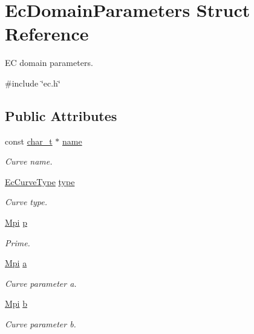 \hypertarget{structEcDomainParameters}{}\section{Ec\+Domain\+Parameters Struct Reference}
\label{structEcDomainParameters}


EC domain parameters.  




{\ttfamily \#include \char`\"{}ec.\+h\char`\"{}}

\subsection*{Public Attributes}
\begin{DoxyCompactItemize}
\item 
const \hyperlink{compiler__port_8h_a40bb5262bf908c328fbcfbe5d29d0201}{char\+\_\+t} $\ast$ \hyperlink{structEcDomainParameters_ae21c1086132f9773bf0be4d23592a297}{name}
\begin{DoxyCompactList}\small\item\em Curve name. \end{DoxyCompactList}\item 
\hyperlink{ec__curves_8h_af38fa6633c02444318870a309134ca21}{Ec\+Curve\+Type} \hyperlink{structEcDomainParameters_a7e42fa63fdb0ee92990c05b0771ac383}{type}
\begin{DoxyCompactList}\small\item\em Curve type. \end{DoxyCompactList}\item 
\hyperlink{structMpi}{Mpi} \hyperlink{structEcDomainParameters_a497e7494540878b966444dc4ad973cdc}{p}
\begin{DoxyCompactList}\small\item\em Prime. \end{DoxyCompactList}\item 
\hyperlink{structMpi}{Mpi} \hyperlink{structEcDomainParameters_a108755e9eeb457a4df867816ee795589}{a}
\begin{DoxyCompactList}\small\item\em Curve parameter a. \end{DoxyCompactList}\item 
\hyperlink{structMpi}{Mpi} \hyperlink{structEcDomainParameters_a13b11f7ebb928f2407abb4ce5b40fffd}{b}
\begin{DoxyCompactList}\small\item\em Curve parameter b. \end{DoxyCompactList}\item 

\end{DoxyCompactItemize}
